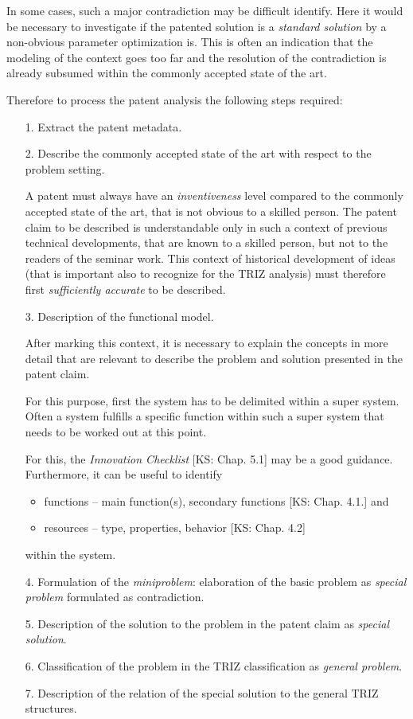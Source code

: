 \documentclass[11pt,a4paper]{article}
\begin{document}
In some cases, such a major contradiction may be difficult identify. Here it
would be necessary to investigate if the patented solution is a \emph{standard
  solution} by a non-obvious parameter optimization is. This is often an
indication that the modeling of the context goes too far and the resolution of
the contradiction is already subsumed within the commonly accepted state of
the art.

Therefore to process the patent analysis the following steps required:
\begin{itemize}
\item [1.] Extract the patent metadata.
  
\item [2.] Describe the commonly accepted state of the art with respect to the
  problem setting.

  A patent must always have an \emph{inventiveness} level compared to the
  commonly accepted state of the art, that is not obvious to a skilled
  person. The patent claim to be described is understandable only in such a
  context of previous technical developments, that are known to a skilled
  person, but not to the readers of the seminar work. This context of
  historical development of ideas (that is important also to recognize for the
  TRIZ analysis) must therefore first \emph{sufficiently accurate} to be
  described.

\item [3.] Description of the functional model.

  After marking this context, it is necessary to explain the concepts in more
  detail that are relevant to describe the problem and solution presented in
  the patent claim.

  For this purpose, first the system has to be delimited within a super
  system.  Often a system fulfills a specific function within such a super
  system that needs to be worked out at this point.
  
  For this, the \emph{Innovation Checklist} [KS: Chap. 5.1] may be a good
  guidance. Furthermore, it can be useful to identify
  \begin{itemize}
  \item functions -- main function(s), secondary functions [KS: Chap. 4.1.]
    and
  \item resources -- type, properties, behavior [KS: Chap. 4.2]
  \end{itemize}
  within the system.

\item [4.] Formulation of the \emph{miniproblem}: elaboration of the basic
  problem as \emph{special problem} formulated as contradiction.

\item [5.] Description of the solution to the problem in the patent claim as
  \emph{special solution}.

\item [6.] Classification of the problem in the TRIZ classification as
  \emph{general problem}.

\item [7.] Description of the relation of the special solution to the general
  TRIZ structures.
\end{itemize}
\end{document}
